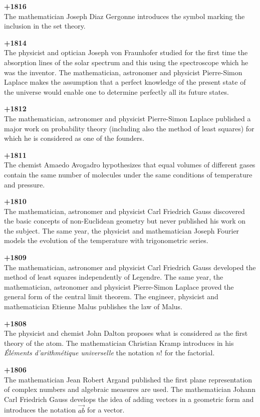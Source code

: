 \textbf{+1816}\\
The mathematician Joseph Diaz Gergonne introduces the symbol marking the inclusion in the set theory.

\textbf{+1814}\\
The physicist and optician Joseph von Fraunhofer studied for the first time the absorption lines of the solar spectrum and this using the spectroscope which he was the inventor. The mathematician, astronomer and physicist Pierre-Simon Laplace makes the assumption that a perfect knowledge of the present state of the universe would enable one to determine perfectly all its future states.

\textbf{+1812}\\
The mathematician, astronomer and physicist Pierre-Simon Laplace published a major work on probability theory (including also the method of least squares) for which he is considered as one of the founders.

\textbf{+1811}\\
The chemist Amaedo Avogadro hypothesizes that equal volumes of different gases contain the same number of molecules under the same conditions of temperature and pressure.

\textbf{+1810}\\
The mathematician, astronomer and physicist Carl Friedrich Gauss discovered the basic concepts of non-Euclidean geometry but never published his work on the subject. The same year, the physicist and mathematician Joseph Fourier models the evolution of the temperature with trigonometric series.

\textbf{+1809}\\
The mathematician, astronomer and physicist Carl Friedrich Gauss developed the method of least squares independently of Legendre. The same year, the mathematician, astronomer and physicist Pierre-Simon Laplace proved the general form of the central limit theorem. The engineer, physicist and mathematician Etienne Malus publishes the law of Malus.

\textbf{+1808}\\
The physicist and chemist John Dalton proposes what is considered as the first theory of the atom. The mathematician Christian Kramp introduces in his \textit{Éléments d'arithmétique universelle} the notation $n!$ for the factorial.

\textbf{+1806}\\
The mathematician Jean Robert Argand published the first plane representation of complex numbers and algebraic measures are used. The mathematician Johann Carl Friedrich Gauss develops the idea of adding vectors in a geometric form and introduces the notation $\overrightarrow{ab}$ for a vector.

